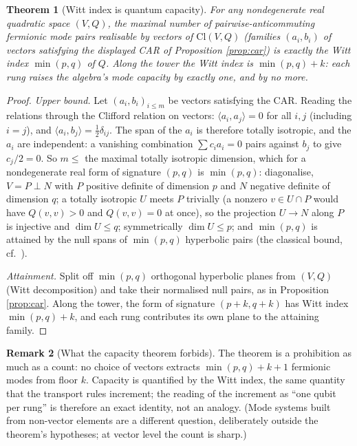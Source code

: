 \documentclass[11pt]{article}
\newtheorem{theorem}{Theorem}[section]
\theoremstyle{definition}
\newtheorem{remark}[theorem]{Remark}
\newcommand{\Cl}{\mathrm{Cl}}
\begin{document}
\begin{theorem}[Witt index is quantum capacity]\label{thm:capacity}
For any nondegenerate real quadratic space $(V, Q)$, the maximal number of pairwise-anticommuting fermionic mode pairs realisable by \emph{vectors} of $\Cl(V, Q)$ (families $(a_i, b_i)$ of vectors satisfying the displayed CAR of Proposition \ref{prop:car}) is exactly the Witt index $\min(p,q)$ of $Q$. Along the tower the Witt index is $\min(p,q) + k$: each rung raises the algebra's mode capacity by exactly one, and by no more.
\end{theorem}

\begin{proof}
\emph{Upper bound.} Let $(a_i, b_i)_{i \leq m}$ be vectors satisfying the CAR. Reading the relations through the Clifford relation on vectors: $\langle a_i, a_j \rangle = 0$ for all $i, j$ (including $i = j$), and $\langle a_i, b_j \rangle = \tfrac12 \delta_{ij}$. The span of the $a_i$ is therefore totally isotropic, and the $a_i$ are independent: a vanishing combination $\sum c_i a_i = 0$ pairs against $b_j$ to give $c_j/2 = 0$. So $m \leq$ the maximal totally isotropic dimension, which for a nondegenerate real form of signature $(p,q)$ is $\min(p,q)$: diagonalise, $V = P \perp N$ with $P$ positive definite of dimension $p$ and $N$ negative definite of dimension $q$; a totally isotropic $U$ meets $P$ trivially (a nonzero $v \in U \cap P$ would have $Q(v,v) > 0$ and $Q(v,v) = 0$ at once), so the projection $U \to N$ along $P$ is injective and $\dim U \leq q$; symmetrically $\dim U \leq p$; and $\min(p,q)$ is attained by the null spans of $\min(p,q)$ hyperbolic pairs (the classical bound, cf.\ \cite[Ch.~I]{Lam2005}).

\emph{Attainment.} Split off $\min(p,q)$ orthogonal hyperbolic planes from $(V, Q)$ (Witt decomposition) and take their normalised null pairs, as in Proposition \ref{prop:car}. Along the tower, the form of signature $(p{+}k, q{+}k)$ has Witt index $\min(p,q) + k$, and each rung contributes its own plane to the attaining family.
\end{proof}

\begin{remark}[What the capacity theorem forbids]\label{rem:capacityforbids}
The theorem is a prohibition as much as a count: no choice of vectors extracts $\min(p,q) + k + 1$ fermionic modes from floor $k$. Capacity is quantified by the Witt index, the same quantity that the transport rules increment; the reading of the increment as ``one qubit per rung'' is therefore an exact identity, not an analogy. (Mode systems built from non-vector elements are a different question, deliberately outside the theorem's hypotheses; at vector level the count is sharp.)
\end{remark}
\end{document}
